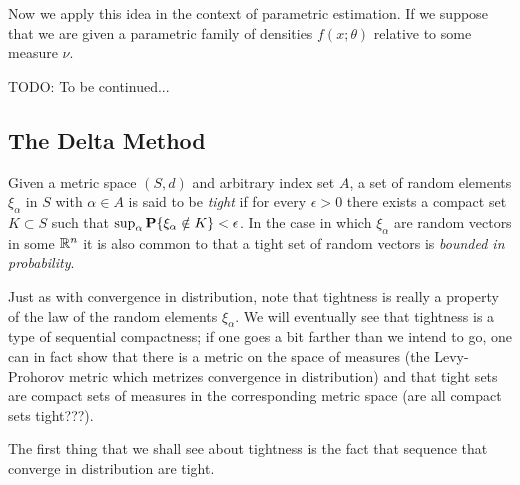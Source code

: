 Now we apply this idea in the context of parametric estimation.  If we
suppose that we are given a parametric family of densities $f(x;
\theta)$ relative to some measure $\nu$.

TODO: To be continued...

\subsection{The Delta Method}

\begin{defn}Given a metric space $(S,d)$ and arbitrary index set $A$, a set of random elements
  $\xi_\alpha$ in $S$ with $\alpha \in A$ is said to be \emph{tight} if for
  every $\epsilon > 0$ there exists a compact set $K \subset S$ such
  that $\sup_\alpha \textbf{P}\{\xi_\alpha \notin K\} < \epsilon$.  In
  the case in which $\xi_\alpha$ are random vectors in some $\mathbb{R}^n$
  it is also common to that a tight set of random vectors is
  \emph{bounded in probability}.
\end{defn}

Just as with convergence in distribution, note that tightness is
really a property of the law of the random elements $\xi_\alpha$.  
We will eventually see that tightness is a type of sequential
compactness; if one goes a bit farther than we intend to go, one can in
fact show that there is a metric on the space of measures (the
Levy-Prohorov metric which metrizes convergence in distribution) and that tight sets are compact sets of
measures in the corresponding metric space (are all compact sets tight???).

The first thing that we shall see about tightness is the fact that
sequence that converge in distribution are tight.

